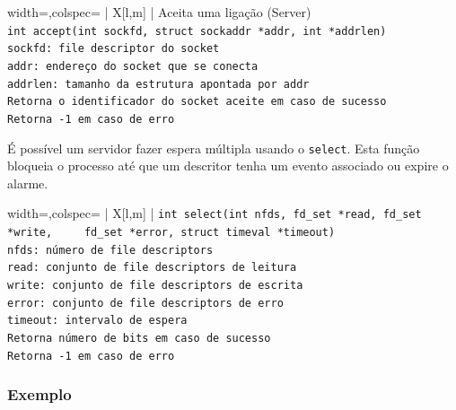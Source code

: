 \documentclass[11pt]{article}
\begin{document}
\begin{tblr}{width=\linewidth,colspec={ | X[l,m] | }}
    \hline
    \centering Aceita uma ligação (Server)                                  \\\hline
    \lstinline|int accept(int sockfd, struct sockaddr *addr, int *addrlen)| \\\hline
    \lstinline|sockfd: file descriptor do socket|                           \\
    \lstinline|addr: endereço do socket que se conecta|                     \\
    \lstinline|addrlen: tamanho da estrutura apontada por addr|             \\\hline
    \lstinline|Retorna o identificador do socket aceite em caso de sucesso| \\
    \lstinline|Retorna -1 em caso de erro|                                  \\\hline
\end{tblr}

É possível um servidor fazer espera múltipla usando o \lstinline|select|. Esta função bloqueia o processo até que um descritor tenha um evento associado ou expire o alarme.

\begin{tblr}{width=\linewidth,colspec={ | X[l,m] | }}
    \hline
    \lstinline|int select(int nfds, fd_set *read, fd_set *write,
    fd_set *error, struct timeval *timeout)|                   \\\hline
    \lstinline|nfds: número de file descriptors|               \\
    \lstinline|read: conjunto de file descriptors de leitura|  \\
    \lstinline|write: conjunto de file descriptors de escrita| \\
    \lstinline|error: conjunto de file descriptors de erro|    \\
    \lstinline|timeout: intervalo de espera|                   \\\hline
    \lstinline|Retorna número de bits em caso de sucesso|      \\
    \lstinline|Retorna -1 em caso de erro|                     \\\hline
\end{tblr}

\newpage

\subsubsection*{Exemplo}
\end{document}
